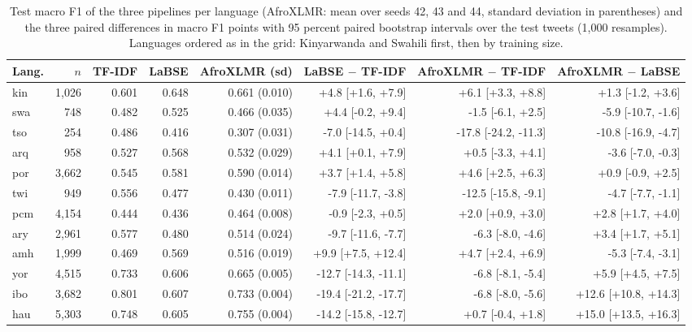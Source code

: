 \documentclass[11pt]{article}
\begin{document}
\begin{table}[t]
\centering
\footnotesize
\setlength{\tabcolsep}{4pt}
\begin{tabular}{lrrrrrrr}
\toprule
Lang. & $n$ & TF-IDF & LaBSE & AfroXLMR (sd) & LaBSE $-$ TF-IDF & AfroXLMR $-$ TF-IDF & AfroXLMR $-$ LaBSE \\
\midrule
kin & 1,026 & 0.601 & 0.648 & 0.661 (0.010) & +4.8 [+1.6, +7.9] & +6.1 [+3.3, +8.8] & +1.3 [-1.2, +3.6] \\
swa & 748 & 0.482 & 0.525 & 0.466 (0.035) & +4.4 [-0.2, +9.4] & -1.5 [-6.1, +2.5] & -5.9 [-10.7, -1.6] \\
tso & 254 & 0.486 & 0.416 & 0.307 (0.031) & -7.0 [-14.5, +0.4] & -17.8 [-24.2, -11.3] & -10.8 [-16.9, -4.7] \\
arq & 958 & 0.527 & 0.568 & 0.532 (0.029) & +4.1 [+0.1, +7.9] & +0.5 [-3.3, +4.1] & -3.6 [-7.0, -0.3] \\
por & 3,662 & 0.545 & 0.581 & 0.590 (0.014) & +3.7 [+1.4, +5.8] & +4.6 [+2.5, +6.3] & +0.9 [-0.9, +2.5] \\
twi & 949 & 0.556 & 0.477 & 0.430 (0.011) & -7.9 [-11.7, -3.8] & -12.5 [-15.8, -9.1] & -4.7 [-7.7, -1.1] \\
pcm & 4,154 & 0.444 & 0.436 & 0.464 (0.008) & -0.9 [-2.3, +0.5] & +2.0 [+0.9, +3.0] & +2.8 [+1.7, +4.0] \\
ary & 2,961 & 0.577 & 0.480 & 0.514 (0.024) & -9.7 [-11.6, -7.7] & -6.3 [-8.0, -4.6] & +3.4 [+1.7, +5.1] \\
amh & 1,999 & 0.469 & 0.569 & 0.516 (0.019) & +9.9 [+7.5, +12.4] & +4.7 [+2.4, +6.9] & -5.3 [-7.4, -3.1] \\
yor & 4,515 & 0.733 & 0.606 & 0.665 (0.005) & -12.7 [-14.3, -11.1] & -6.8 [-8.1, -5.4] & +5.9 [+4.5, +7.5] \\
ibo & 3,682 & 0.801 & 0.607 & 0.733 (0.004) & -19.4 [-21.2, -17.7] & -6.8 [-8.0, -5.6] & +12.6 [+10.8, +14.3] \\
hau & 5,303 & 0.748 & 0.605 & 0.755 (0.004) & -14.2 [-15.8, -12.7] & +0.7 [-0.4, +1.8] & +15.0 [+13.5, +16.3] \\
\bottomrule
\end{tabular}
\caption{Test macro F1 of the three pipelines per language (AfroXLMR: mean over seeds 42, 43 and 44, standard deviation in parentheses) and the three paired differences in macro F1 points with 95 percent paired bootstrap intervals over the test tweets (1,000 resamples). Languages ordered as in the grid: Kinyarwanda and Swahili first, then by training size.}
\label{tab:results}
\end{table}
\end{document}
